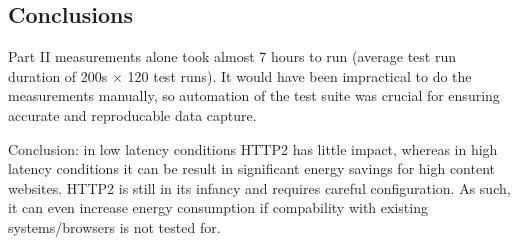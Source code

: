 \documentclass{article}
\begin{document}

\subsection{Conclusions}
\label{chapter:conclusions}

Part II measurements alone took almost 7 hours to run (average test run duration of 200s $\times$ 120 test runs). It would have been impractical to do the measurements manually, so automation of the test suite was crucial for ensuring accurate and reproducable data capture.

Conclusion: in low latency conditions HTTP2 has little impact, whereas in high latency conditions it can be result in significant energy savings for high content websites. HTTP2 is still in its infancy and requires careful configuration. As such, it can even increase energy consumption if compability with existing systems/browsers is not tested for.




\end{document}
